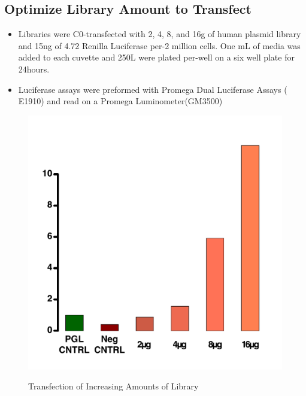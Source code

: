 \documentclass[a4paper]{article}
\begin{document}
    \subsection{Optimize Library Amount to Transfect}
    	\begin{itemize}
        
        	\item Libraries were C0-transfected with 2, 4, 8, and 16\textmu g of human plasmid library and 15ng of 4.72 Renilla Luciferase per-2 million cells. One mL of media was added to each cuvette and 250\textmu L were plated per-well on a six well plate for 24hours. 
            
            \item Luciferase assays were preformed with Promega Dual Luciferase Assays (	E1910) and read on a Promega Luminometer(GM3500) 
        
        \end{itemize}
    
   		\begin{figure}[H]
			\centering
			\includegraphics[width=1\textwidth]{2016_07_14_IncreasingLibraryFINAL.pdf}
			\label{fig:Lib_Amt}
			\caption{Transfection of Increasing Amounts of Library}
        \end{figure}
        
\end{document}
